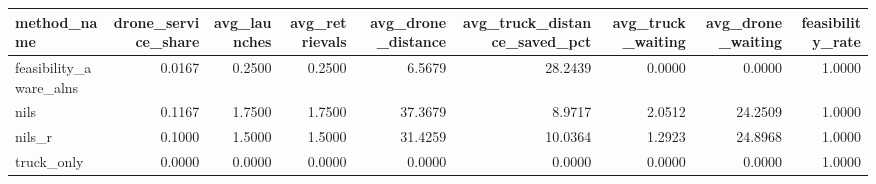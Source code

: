 \begin{tabular}{lrrrrrrrr}
\toprule
method_name & drone_service_share & avg_launches & avg_retrievals & avg_drone_distance & avg_truck_distance_saved_pct & avg_truck_waiting & avg_drone_waiting & feasibility_rate \\
\midrule
feasibility_aware_alns & 0.0167 & 0.2500 & 0.2500 & 6.5679 & 28.2439 & 0.0000 & 0.0000 & 1.0000 \\
nils & 0.1167 & 1.7500 & 1.7500 & 37.3679 & 8.9717 & 2.0512 & 24.2509 & 1.0000 \\
nils_r & 0.1000 & 1.5000 & 1.5000 & 31.4259 & 10.0364 & 1.2923 & 24.8968 & 1.0000 \\
truck_only & 0.0000 & 0.0000 & 0.0000 & 0.0000 & 0.0000 & 0.0000 & 0.0000 & 1.0000 \\
\bottomrule
\end{tabular}
